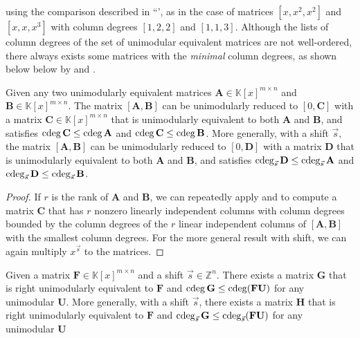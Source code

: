 using the comparison described in ``', as
in the case of matrices $\left[x,x^{2},x^{2}\right]$ and $\left[x,x,x^{3}\right]$
with column degrees $\left[1,2,2\right]$ and $\left[1,1,3\right]$.
Although the lists of column degrees of the set of unimodular equivalent
matrices are not well-ordered, there always exists some matrices with
the \emph{minimal} column degrees, as shown below below by 
and .
\begin{lem}
\label{lem:matrixGCDlowerDegrees}Given any two unimodularly equivalent
matrices $\mathbf{A}\in\mathbb{K}\left[x\right]^{m\times n}$ and
$\mathbf{B}\in\mathbb{K}\left[x\right]^{m\times n}$. The matrix $\left[\mathbf{A},\mathbf{B}\right]$
can be unimodularly reduced to $\left[0,\mathbf{C}\right]$ with a
matrix $\mathbf{C}\in\mathbb{K}\left[x\right]^{m\times n}$ that is
unimodularly equivalent to both $\mathbf{A}$ and $\mathbf{B}$, and
satisfies $\cdeg\mathbf{C}\le\cdeg\mathbf{A}$ and $\cdeg\mathbf{C}\le\cdeg\mathbf{B}$.
More generally, with a shift $\vec{s},$ the matrix $\left[\mathbf{A},\mathbf{B}\right]$
can be unimodularly reduced to $\left[0,\mathbf{D}\right]$ with a
matrix $\mathbf{D}$ that is unimodularly equivalent to both $\mathbf{A}$
and $\mathbf{B}$, and satisfies $\cdeg_{\vec{s}}\mathbf{D}\le\cdeg_{\vec{s}}\mathbf{A}$
and $\cdeg_{\vec{s}}\mathbf{D}\le\cdeg_{\vec{s}}\mathbf{B}$. \end{lem}
\begin{proof}
If $r$ is the rank of $\mathbf{A}$ and $\mathbf{B}$, we can repeatedly
apply  and 
to compute a matrix $\mathbf{C}$ that has $r$ nonzero linearly independent
columns with column degrees bounded by the column degrees of the $r$
linear independent columns of $\left[\mathbf{A},\mathbf{B}\right]$
with the smallest column degrees. For the more general result with
shift, we can again multiply $x^{\vec{s}}$ to the matrices.\end{proof}
\begin{cor}
\label{cor:minimalUnimodularEquivalentMatrix}Given a matrix $\mathbf{F}\in\mathbb{K}\left[x\right]^{m\times n}$
and a shift $\vec{s}\in\mathbb{Z}^{n}$. There exists a matrix $\mathbf{G}$
that is right unimodularly equivalent to $\mathbf{F}$ and $\cdeg\mathbf{G}\le\cdeg(\mathbf{F}\mathbf{U})$
for any unimodular $\mathbf{U}$. More generally, with a shift $\vec{s}$,
there exists a matrix $\mathbf{H}$ that is right unimodularly equivalent
to $\mathbf{F}$ and $\cdeg_{\vec{s}}\mathbf{G}\le\cdeg_{\vec{s}}(\mathbf{F}\mathbf{U})$
for any unimodular $\mathbf{U}$\end{cor}
